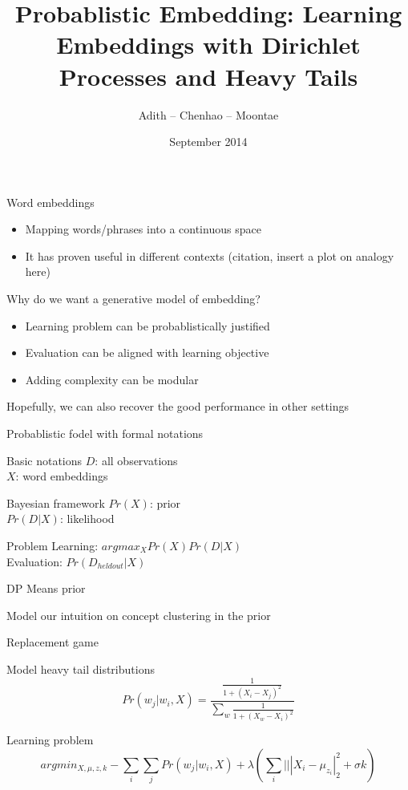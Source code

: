 \documentclass{beamer}
\title[ProbEmbed]{Probablistic Embedding: Learning Embeddings with Dirichlet Processes and Heavy Tails}
\author{Adith -- Chenhao -- Moontae}
\institute{Cornell}
\date{September 2014}
\begin{document}
\begin{frame}
\titlepage
\end{frame}

\begin{frame}{Word embeddings}
  \begin{itemize}
    \item Mapping words/phrases into a continuous space
    \item It has proven useful in different contexts (citation, insert a plot on analogy here)
  \end{itemize}
\end{frame}

\begin{frame}{Why do we want a generative model of embedding?}
  \begin{itemize}
    \item Learning problem can be probablistically justified
    \item Evaluation can be aligned with learning objective
    \item Adding complexity can be modular
  \end{itemize}
  \pause
  Hopefully, we can also recover the good performance in other settings
\end{frame}

\begin{frame}{Probablistic fodel with formal notations}
  \begin{block}{Basic notations}
    $D$: all observations\\
    $X$: word embeddings
  \end{block}
  \begin{block}{Bayesian framework}
    $Pr(X)$: prior\\
    $Pr(D|X)$: likelihood
  \end{block}
  \begin{block}{Problem}
    Learning: $argmax_{X} Pr(X)Pr(D|X)$\\
    Evaluation: $Pr(D_{heldout}|X)$
  \end{block}
\end{frame}


\begin{frame}{DP Means prior}
  \begin{block}{Model our intuition on concept clustering in the prior}
  \end{block}
\end{frame}

\begin{frame}{Replacement game}
  \begin{block}{Model heavy tail distributions}
    $$Pr(w_j|w_i, X) = \frac{\frac{1}{1+(X_i-X_j)^2}}{\sum_{w}\frac{1}{1+(X_w-X_i)^2}}$$
  \end{block}
  \pause
  \begin{block}{Learning problem}
    $$argmin_{X, \mu, z, k} -\sum_{i}\sum_{j}Pr(w_j|w_i, X)+\lambda(\sum_i|||X_i-\mu_{z_i}|_2^2 + \sigma k)$$
  \end{block}
\end{frame}
\end{document}
